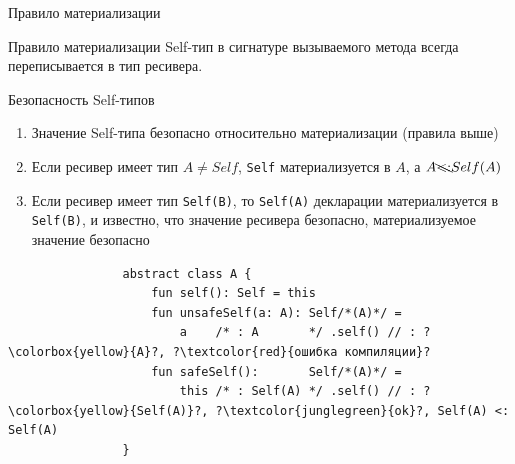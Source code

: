 \documentclass[aspectratio=169,usenames,dvipsnames]{beamer}
\begin{document}
    \begin{frame}[fragile]{Правило материализации}
        \begin{block}{Правило материализации}
            Self-тип в сигнатуре вызываемого метода всегда переписывается в тип ресивера.
        \end{block}
        \begin{block}{Безопасность Self-типов}
            \begin{enumerate}
                \item Значение Self-типа безопасно относительно материализации (правила выше)
                \item Если ресивер имеет тип $A \neq Self$, \texttt{Self} материализуется в $A$, а $A \bcancel{<:} Self(A)$
                \item Если ресивер имеет тип \texttt{Self(B)}, то \texttt{Self(A)} декларации материализуется в \texttt{Self(B)}, и известно, что значение ресивера безопасно, материализуемое значение безопасно
            \end{enumerate}
            \begin{verbatim}
                abstract class A {
                    fun self(): Self = this
                    fun unsafeSelf(a: A): Self/*(A)*/ =
                        a    /* : A       */ .self() // : ?\colorbox{yellow}{A}?, ?\textcolor{red}{ошибка компиляции}?
                    fun safeSelf():       Self/*(A)*/ =
                        this /* : Self(A) */ .self() // : ?\colorbox{yellow}{Self(A)}?, ?\textcolor{junglegreen}{ok}?, Self(A) <: Self(A)
                }
            \end{verbatim}
        \end{block}
    \end{frame}
\end{document}

